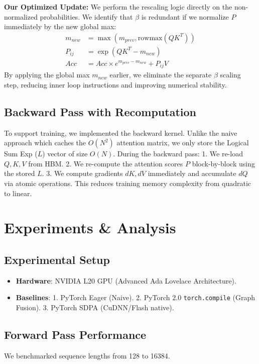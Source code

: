 \documentclass[10pt,conference,letterpaper]{IEEEtran}
\begin{document}
\textbf{Our Optimized Update:}
We perform the rescaling logic directly on the non-normalized probabilities. We identify that $\beta$ is redundant if we normalize $P$ immediately by the new global max:
\begin{equation}
\begin{aligned}
m_{new} &= \max(m_{prev}, \text{rowmax}(QK^T)) \\
P_{ij} &= \exp(QK^T - m_{new}) \\
Acc &= Acc \times e^{m_{prev} - m_{new}} + P_{ij} V
\end{aligned}
\end{equation}
By applying the global max $m_{new}$ earlier, we eliminate the separate $\beta$ scaling step, reducing inner loop instructions and improving numerical stability.

\subsection{Backward Pass with Recomputation}
To support training, we implemented the backward kernel. Unlike the naive approach which caches the $O(N^2)$ attention matrix, we only store the Logical Sum Exp ($L$) vector of size $O(N)$.
During the backward pass:
1. We re-load $Q, K, V$ from HBM.
2. We re-compute the attention scores $P$ block-by-block using the stored $L$.
3. We compute gradients $dK, dV$ immediately and accumulate $dQ$ via atomic operations.
This reduces training memory complexity from quadratic to linear.

\section{Experiments \& Analysis}

\subsection{Experimental Setup}
\begin{itemize}
    \item \textbf{Hardware}: NVIDIA L20 GPU (Advanced Ada Lovelace Architecture).
    \item \textbf{Baselines}: 
    1. PyTorch Eager (Naive).
    2. PyTorch 2.0 \texttt{torch.compile} (Graph Fusion).
    3. PyTorch SDPA (CuDNN/Flash native).
\end{itemize}

\subsection{Forward Pass Performance}
We benchmarked sequence lengths from 128 to 16384.
\end{document}

